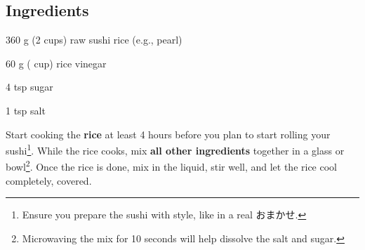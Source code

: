 \newpage
{}

\subsection*{Ingredients}
\begin{ingredients}
	\item 360 g (2 cups) raw sushi rice (e.g., pearl)
	\item 60 g ( cup) rice vinegar
	\item 4 tsp sugar
	\item 1 tsp salt
\end{ingredients}

\medskip

Start cooking the \textbf{rice} at least 4 hours before you plan to start rolling your sushi\footnote{Ensure you prepare the sushi with style, like in a real {\japanesefont おまかせ.}}.
While the rice cooks, mix \textbf{all other ingredients} together in a glass or bowl\footnote{Microwaving the mix for 10 seconds will help dissolve the salt and sugar.}.
Once the rice is done, mix in the liquid, stir well, and let the rice cool completely, covered.

\vspace*{0.75 cm}

\begin{recipeblock}
	
\end{recipeblock}
